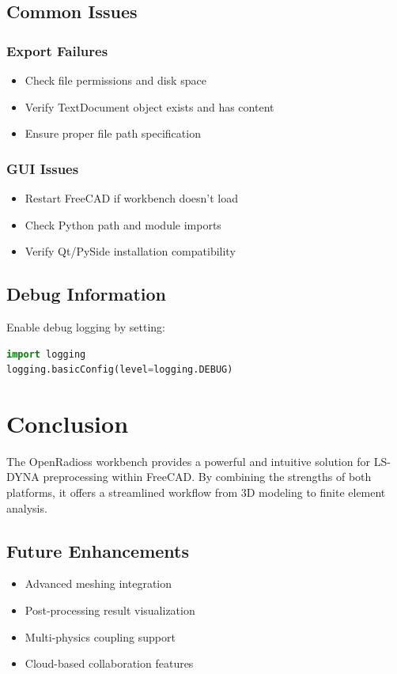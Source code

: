 \documentclass[12pt,a4paper]{article}
\begin{document}
\subsection{Common Issues}

\subsubsection{Export Failures}
\begin{itemize}
    \item Check file permissions and disk space
    \item Verify TextDocument object exists and has content
    \item Ensure proper file path specification
\end{itemize}

\subsubsection{GUI Issues}
\begin{itemize}
    \item Restart FreeCAD if workbench doesn't load
    \item Check Python path and module imports
    \item Verify Qt/PySide installation compatibility
\end{itemize}

\subsection{Debug Information}
Enable debug logging by setting:
\begin{lstlisting}[language=Python]
import logging
logging.basicConfig(level=logging.DEBUG)
\end{lstlisting}

\section{Conclusion}

The OpenRadioss workbench provides a powerful and intuitive solution for LS-DYNA preprocessing within FreeCAD. By combining the strengths of both platforms, it offers a streamlined workflow from 3D modeling to finite element analysis.

\subsection{Future Enhancements}
\begin{itemize}
    \item Advanced meshing integration
    \item Post-processing result visualization
    \item Multi-physics coupling support
    \item Cloud-based collaboration features
\end{itemize}
\end{document}
